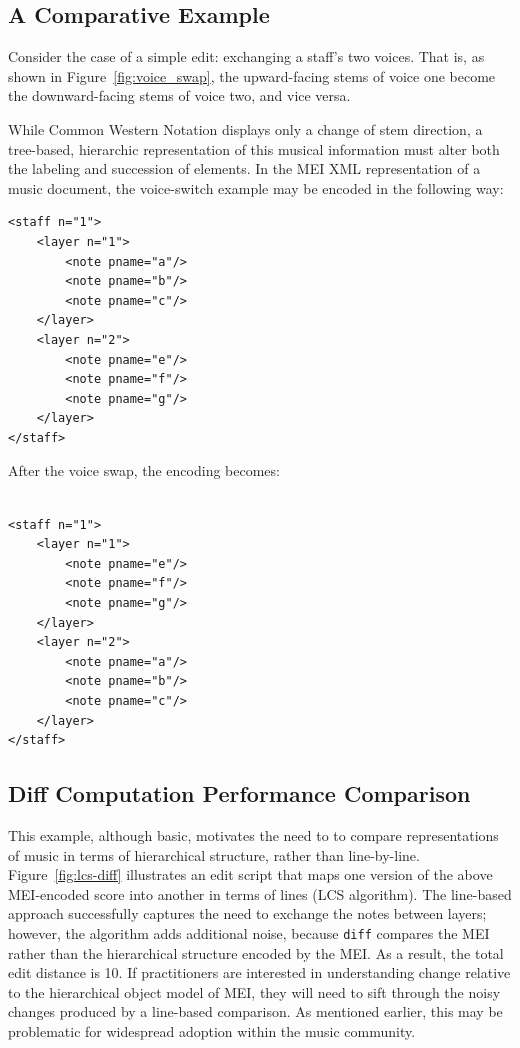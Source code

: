 \documentclass{article}
\newcommand{\code}[1]{\texttt{#1}}
\begin{document}
\subsection{A Comparative Example}
Consider the case of a simple edit: exchanging a staff's two voices.
That is, as shown in Figure~\ref{fig:voice_swap}, the upward-facing
stems of voice one become the downward-facing stems of voice two, and
vice versa.

While Common Western Notation displays only a change of stem
direction, a tree-based, hierarchic representation of this musical
information must alter both the labeling and succession of elements.
In the MEI XML representation of a music document, the voice-switch
example may be encoded in the following way:


\begin{verbatim}
<staff n="1"> 
    <layer n="1">
        <note pname="a"/>
        <note pname="b"/>
        <note pname="c"/>
    </layer>
    <layer n="2">
        <note pname="e"/>
        <note pname="f"/>
        <note pname="g"/>
    </layer>
</staff>
\end{verbatim}

After the voice swap, the encoding becomes:

\begin{verbatim}

<staff n="1">
    <layer n="1">
        <note pname="e"/>
        <note pname="f"/>
        <note pname="g"/>
    </layer>
    <layer n="2">
        <note pname="a"/>
        <note pname="b"/>
        <note pname="c"/>
    </layer>
</staff>
\end{verbatim}


\subsection{Diff Computation Performance Comparison}
This example, although basic, motivates the need to to compare representations of music in terms of 
hierarchical structure, rather than line-by-line. Figure~\ref{fig:lcs-diff} illustrates an edit script that maps one
version of the above MEI-encoded score into another in terms of lines (LCS algorithm).
The line-based approach successfully captures the need to exchange the
notes between layers; however, the algorithm adds additional noise,
because \code{diff} compares the MEI rather than the hierarchical
structure encoded by the MEI.  As a result, the total edit distance is
10.  If practitioners are interested in understanding change relative
to the hierarchical object model of MEI, they will need to sift
through the noisy changes produced by a line-based comparison.  As
mentioned earlier, this may be problematic for widespread adoption
within the music community.
\end{document}
